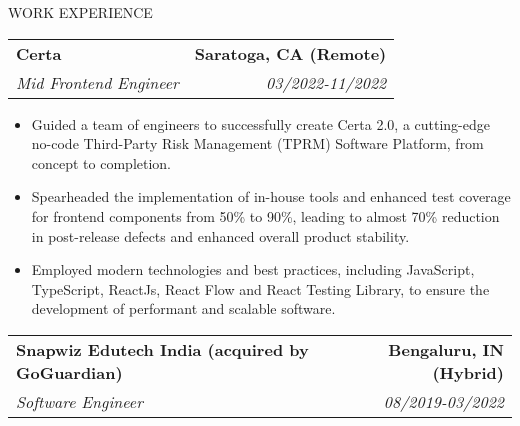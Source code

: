 \documentclass{resume} %
\begin{document}
\vspace{-5pt}
\begin{rSection}{WORK EXPERIENCE}

   \begin{tabularx}{\textwidth}{@{}X r}
      \textbf{Certa} & \textbf{Saratoga, CA (Remote)} \\
      \textit{Mid Frontend Engineer} & \textit{03/2022-11/2022} \\
   \end{tabularx}

   \begin{minipage}[t]{1\textwidth}
      \begin{itemize}[left=0pt, nosep, before=\vspace{-0.5\baselineskip}]
         \item \small Guided a team of engineers to successfully create Certa 2.0, a cutting-edge no-code Third-Party Risk Management (TPRM) Software Platform, from concept to completion.
         \item \small Spearheaded the implementation of in-house tools and enhanced test coverage for frontend components from 50\% to 90\%, leading to almost 70\% reduction in post-release defects and enhanced overall product stability.
         \item \small Employed modern technologies and best practices, including JavaScript, TypeScript, ReactJs, React Flow and React Testing Library, to ensure the development of performant and scalable software.
      \end{itemize}
   \end{minipage}

   \begin{tabularx}{\textwidth}{@{}X r}
      \textbf{Snapwiz Edutech India (acquired by GoGuardian)} & \textbf{Bengaluru, IN (Hybrid)} \\
      \textit{Software Engineer} & \textit{08/2019-03/2022} \\
   \end{tabularx}


\end{rSection}
\end{document}
